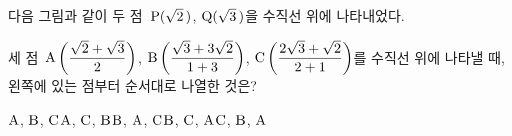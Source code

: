 다음 그림과 같이 두 점~$\mathrm{P}(\sqrt{2}\mkern3mu )$, $\mathrm{Q}(\sqrt{3}\mkern3mu )$을 수직선 위에 나타내었다.\par\smallskip\dispeq{}\par\smallskip\noindent 세 점~$\mathrm{A}\left(\dfrac{\sqrt{2}+\sqrt{3}}{2}\right)$, $\mathrm{B}\left(\dfrac{\sqrt{3}+3\sqrt{2}}{1+3}\right)$, $\mathrm{C}\left(\dfrac{2\sqrt{3}+\sqrt{2}}{2+1}\right)$를 수직선 위에 나타낼 때, 왼쪽에 있는 점부터 순서대로 나열한 것은?
\begin{choices32}{$\mathrm{A}$, $\mathrm{B}$, $\mathrm{C}$}{$\mathrm{A}$, $\mathrm{C}$, $\mathrm{B}$}{$\mathrm{B}$, $\mathrm{A}$, $\mathrm{C}$}{$\mathrm{B}$, $\mathrm{C}$, $\mathrm{A}$}{$\mathrm{C}$, $\mathrm{B}$, $\mathrm{A}$}\end{choices32}
